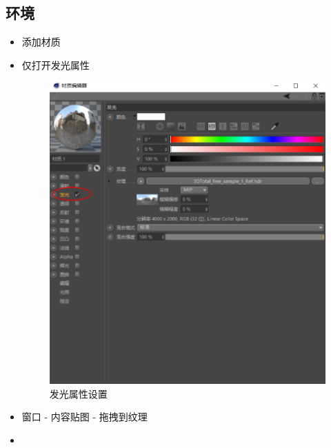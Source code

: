 \documentclass[UTF8,oneside]{ctexbook}
\begin{document}
\subsection{环境}
\begin{itemize}
    \item 添加材质
    \item 仅打开发光属性
    \begin{figure}[H]
        \centering
        \includegraphics[width=0.5\linewidth]{Fig//envior_01.png}
        \vspace{-0.3cm}
        \caption{发光属性设置}\label{fig:envior_01}
    \end{figure}
    \item 窗口 - 内容贴图 - 拖拽到纹理
    \item 
\end{itemize}
\end{document}
